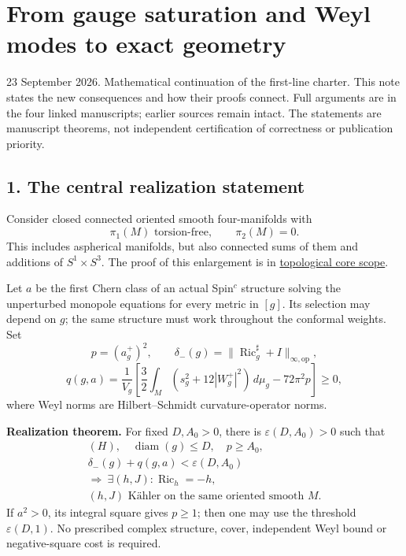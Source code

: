 \documentclass[
  11pt,
]{article}
\author{}
\date{}
\begin{document}
\hypertarget{from-gauge-saturation-and-weyl-modes-to-exact-geometry}{%
\section{From gauge saturation and Weyl modes to exact
geometry}\label{from-gauge-saturation-and-weyl-modes-to-exact-geometry}}

23 September 2026. Mathematical continuation of the first-line charter.
This note states the new consequences and how their proofs connect. Full
arguments are in the four linked manuscripts; earlier sources remain
intact. The statements are manuscript theorems, not independent
certification of correctness or publication priority.

\hypertarget{the-central-realization-statement}{%
\subsection{1. The central realization
statement}\label{the-central-realization-statement}}

Consider closed connected oriented smooth four-manifolds with \[
 \pi_1(M)\text{ torsion-free},\qquad \pi_2(M)=0.              \tag{H}
\] This includes aspherical manifolds, but also connected sums of them
and additions of \(S^1\times S^3\). The proof of this enlargement is in
\href{20260923_topological_core_scope.md}{topological core scope}.

Let \(a\) be the first Chern class of an actual Spin\(^c\) structure
solving the unperturbed monopole equations for every metric in \([g]\).
Its selection may depend on \(g\); the same structure must work
throughout the conformal weights. Set \[
 p=(a_g^+)^2,
 \qquad\delta_-(g)=\|\operatorname{Ric}_g^\sharp+I\|_{\infty,\mathrm{op}},
\] \[
 q(g,a)=\frac1{V_g}\left[
 \frac32\int_M(s_g^2+12|W_g^+|^2)\,d\mu_g-72\pi^2p\right]\ge0,
                                                               \tag{1}
\] where Weyl norms are Hilbert--Schmidt curvature-operator norms.

\textbf{Realization theorem.} For fixed \(D,A_0>0\), there is
\(\varepsilon(D,A_0)>0\) such that \[
 \boxed{\begin{gathered}
 (H),\quad \operatorname{diam}(g)\le D,\quad p\ge A_0,\\
 \delta_-(g)+q(g,a)<\varepsilon(D,A_0)\\
 \Longrightarrow\ \exists(h,J):\operatorname{Ric}_h=-h,\\
 (h,J)\text{ Kähler on the same oriented smooth }M.
 \end{gathered}}
                                                               \tag{2}
\] If \(a^2>0\), its integral square gives \(p\ge1\); then one may use
the threshold \(\varepsilon(D,1)\). No prescribed complex structure,
cover, independent Weyl bound or negative-square cost is required.
\end{document}
